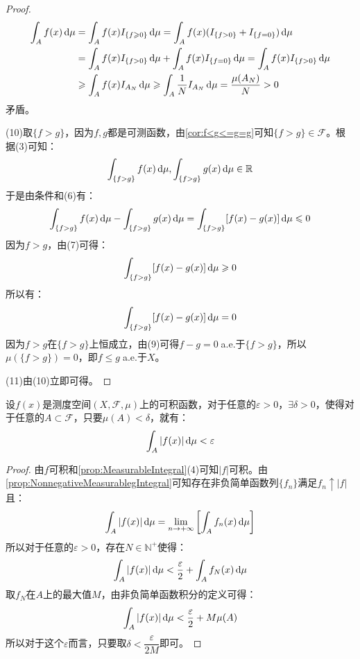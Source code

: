 \begin{proof}
	\begin{align*}
		\int_{A}f(x)\dif\mu&=\int_{A}f(x)I_{\{f\geqslant0\}}\dif\mu=\int_{A}f(x)(I_{\{f>0\}}+I_{\{f=0\}})\dif\mu \\
		&=\int_{A}f(x)I_{\{f>0\}}\dif\mu+\int_{A}f(x)I_{\{f=0\}}\dif\mu=\int_{A}f(x)I_{\{f>0\}}\dif\mu \\
		&\geqslant\int_{A}f(x)I_{A_N}\dif\mu\geqslant\int_{A}\frac{1}{N}I_{A_N}\dif\mu=\frac{\mu(A_N)}{N}>0
	\end{align*}
	矛盾。\par
	(10)取$\{f>g\}$，因为$f,g$都是可测函数，由\cref{cor:f<g<=g=g}可知$\{f>g\}\in \mathscr{F}$。根据(3)可知：
	\begin{equation*}
		\int_{\{f>g\}}f(x)\mathop{}\!\mathrm{d}\mu,\int_{\{f>g\}}g(x)\mathop{}\!\mathrm{d}\mu\in\mathbb{R}^{}
	\end{equation*}
	于是由条件和(6)有：
	\begin{equation*}
		\int_{\{f>g\}}f(x)\mathop{}\!\mathrm{d}\mu-\int_{\{f>g\}}g(x)\mathop{}\!\mathrm{d}\mu=\int_{\{f>g\}}[f(x)-g(x)]\mathop{}\!\mathrm{d}\mu\leqslant0
	\end{equation*}
	因为$f>g$，由(7)可得：
	\begin{equation*}
		\int_{\{f>g\}}[f(x)-g(x)]\mathop{}\!\mathrm{d}\mu\geqslant0
	\end{equation*}
	所以有：
	\begin{equation*}
		\int_{\{f>g\}}[f(x)-g(x)]\mathop{}\!\mathrm{d}\mu=0
	\end{equation*}
	因为$f>g$在$\{f>g\}$上恒成立，由(9)可得$f-g=0\;$a.e.于$\{f>g\}$，所以$\mu(\{f>g\})=0$，即$f\leqslant g\;$a.e.于$X$。\par
	(11)由(10)立即可得。
\end{proof}
\begin{theorem}[积分的绝对连续性]
	设$f(x)$是测度空间$(X,\mathscr{F},\mu)$上的可积函数，对于任意的$\varepsilon>0$，$\exists\delta>0$，使得对于任意的$A\subset\mathscr{F}$，只要$\mu(A)<\delta$，就有：
	\begin{equation*}
		\int_{A}|f(x)|\mathop{}\!\mathrm{d}\mu<\varepsilon
	\end{equation*}
\end{theorem}
\begin{proof}
	由$f$可积和\cref{prop:MeasurableIntegral}(4)可知$|f|$可积。由\cref{prop:NonnegativeMeasurablegIntegral}可知存在非负简单函数列$\{f_n\}$满足$f_n\uparrow |f|$且：
	\begin{equation*}
		\int_{A}|f(x)|\mathop{}\!\mathrm{d}\mu=\lim_{n\to+\infty}\left[\int_{A}f_n(x)\mathop{}\!\mathrm{d}\mu\right]
	\end{equation*}
	所以对于任意的$\varepsilon>0$，存在$N\in\mathbb{N}^+$使得：
	\begin{equation*}
		\int_{A}|f(x)|\mathop{}\!\mathrm{d}\mu<\frac{\varepsilon}{2}+\int_{A}f_N(x)\mathop{}\!\mathrm{d}\mu
	\end{equation*}
	取$f_N$在$A$上的最大值$M$，由非负简单函数积分的定义可得：
	\begin{equation*}
		\int_{A}|f(x)|\mathop{}\!\mathrm{d}\mu<\frac{\varepsilon}{2}+M\mu(A)
	\end{equation*}
	所以对于这个$\varepsilon$而言，只要取$\delta<\dfrac{\varepsilon}{2M}$即可。
\end{proof}
